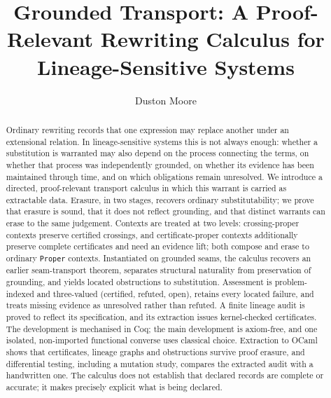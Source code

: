 \documentclass{lmcs}
\begin{document}
\title[Grounded Transport]{Grounded Transport: A Proof-Relevant Rewriting Calculus for Lineage-Sensitive Systems}

\author[D.~Moore]{Duston Moore}
\address{Independent Researcher, Edmonton, Alberta, Canada}


\begin{abstract}
\noindent
Ordinary rewriting records that one expression may replace another under an extensional relation.
In lineage-sensitive systems this is not always enough: whether a substitution is warranted may also depend on the process connecting the terms, on whether that process was independently grounded, on whether its evidence has been maintained through time, and on which obligations remain unresolved.
We introduce a directed, proof-relevant transport calculus in which this warrant is carried as extractable data.
Erasure, in two stages, recovers ordinary substitutability; we prove that erasure is sound, that it does not reflect grounding, and that distinct warrants can erase to the same judgement.
Contexts are treated at two levels: crossing-proper contexts preserve certified crossings, and certificate-proper contexts additionally preserve complete certificates and need an evidence lift; both compose and erase to ordinary \texttt{Proper} contexts.
Instantiated on grounded seams, the calculus recovers an earlier seam-transport theorem, separates structural naturality from preservation of grounding, and yields located obstructions to substitution.
Assessment is problem-indexed and three-valued (certified, refuted, open), retains every located failure, and treats missing evidence as unresolved rather than refuted.
A finite lineage audit is proved to reflect its specification, and its extraction issues kernel-checked certificates.
The development is mechanised in Coq; the main development is axiom-free, and one isolated, non-imported functional converse uses classical choice. Extraction to OCaml shows that certificates, lineage graphs and obstructions survive proof erasure, and differential testing, including a mutation study, compares the extracted audit with a handwritten one.
The calculus does not establish that declared records are complete or accurate; it makes precisely explicit what is being declared.
\end{abstract}
\end{document}
